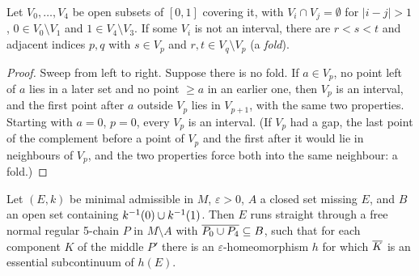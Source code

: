 \begin{lemma}[Folds]\label{lem:fold}
Let $V_0,\dots,V_4$ be open subsets of $[0,1]$ covering it, with $V_i\cap V_j=\emptyset$ for $|i-j|>1$, $0\in V_0\setminus V_1$ and
$1\in V_4\setminus V_3$. If some $V_i$ is not an interval, there are $r<s<t$ and adjacent indices $p,q$ with $s\in V_p$ and
$r,t\in V_q\setminus V_p$ (a \emph{fold}).
\end{lemma}

\begin{proof}
Sweep from left to right. Suppose there is no fold. If $a\in V_p$, no point left of $a$ lies in a later set and no point $\ge
a$ in an earlier one, then $V_p$ is an interval, and the first point after $a$ outside $V_p$ lies in $V_{p+1}$, with the
same two properties. Starting with $a=0$, $p=0$, every $V_p$ is an interval. (If $V_p$ had a gap, the last point of the
complement before a point of $V_p$ and the first after it would lie in neighbours of $V_p$, and the two properties force both
into the same neighbour: a fold.)
\end{proof}


\begin{theorem}\label{thm:h84-lemma13}
Let $(E,k)$ be minimal admissible in $M$, $\varepsilon>0$, $A$ a closed set missing $E$, and $B$ an open set containing $k^{-1}(0)\cup k^{-1}(1)$. Then $E$ runs straight through a free normal regular 5-chain $P$ in $M\setminus A$ with $\overline{P_0\cup P_4}\subseteq B$, such that
for each component $K$ of the middle $P'$ there is an $\varepsilon$-homeomorphism $h$ for which $\overline{K}$ is an essential
subcontinuum of $h(E)$.
\end{theorem}

